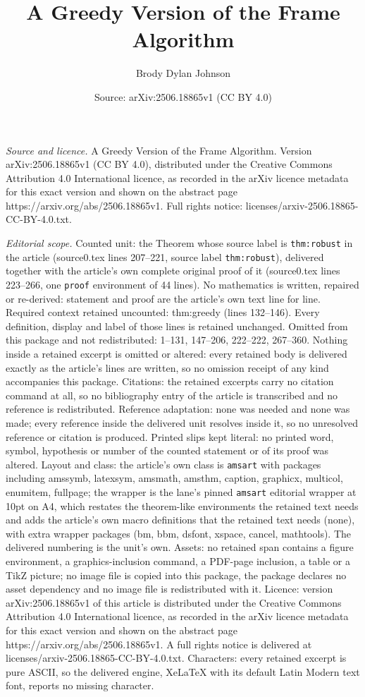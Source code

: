 \documentclass[10pt,a4paper]{amsart}
\title[A Greedy Version of the Frame Algorithm]{A Greedy Version of the Frame Algorithm}
\author{Brody Dylan Johnson}
\date{Source: arXiv:2506.18865v1 (CC BY 4.0)}
\begin{document}
\maketitle

\noindent\emph{Source and licence.} A Greedy Version of the Frame Algorithm. Version arXiv:2506.18865v1 (CC BY 4.0), distributed under the Creative Commons Attribution 4.0 International licence, as recorded in the arXiv licence metadata for this exact version and shown on the abstract page https://arxiv.org/abs/2506.18865v1. Full rights notice: licenses/arxiv-2506.18865-CC-BY-4.0.txt.\par\smallskip

\noindent\textit{Editorial scope.} Counted unit: the Theorem whose source label is \texttt{thm:robust} in the article (source0.tex lines 207--221, source label \texttt{thm:robust}), delivered together with the article's own complete original proof of it (source0.tex lines 223--266, one \texttt{proof} environment of 44 lines). No mathematics is written, repaired or re-derived: statement and proof are the article's own text line for line. Required context retained uncounted: thm:greedy (lines 132--146). Every definition, display and label of those lines is retained unchanged. Omitted from this package and not redistributed: 1--131, 147--206, 222--222, 267--360. Nothing inside a retained excerpt is omitted or altered: every retained body is delivered exactly as the article's lines are written, so no omission receipt of any kind accompanies this package. Citations: the retained excerpts carry no citation command at all, so no bibliography entry of the article is transcribed and no reference is redistributed. Reference adaptation: none was needed and none was made; every reference inside the delivered unit resolves inside it, so no unresolved reference or citation is produced. Printed slips kept literal: no printed word, symbol, hypothesis or number of the counted statement or of its proof was altered. Layout and class: the article's own class is \texttt{amsart} with packages including amssymb, latexsym, amsmath, amsthm, caption, graphicx, multicol, enumitem, fullpage; the wrapper is the lane's pinned \texttt{amsart} editorial wrapper at 10pt on A4, which restates the theorem-like environments the retained text needs and adds the article's own macro definitions that the retained text needs (none), with extra wrapper packages (bm, bbm, dsfont, xspace, cancel, mathtools). The delivered numbering is the unit's own. Assets: no retained span contains a figure environment, a graphics-inclusion command, a PDF-page inclusion, a table or a TikZ picture; no image file is copied into this package, the package declares no asset dependency and no image file is redistributed with it. Licence: version arXiv:2506.18865v1 of this article is distributed under the Creative Commons Attribution 4.0 International licence, as recorded in the arXiv licence metadata for this exact version and shown on the abstract page https://arxiv.org/abs/2506.18865v1. A full rights notice is delivered at licenses/arxiv-2506.18865-CC-BY-4.0.txt. Characters: every retained excerpt is pure ASCII, so the delivered engine, XeLaTeX with its default Latin Modern text font, reports no missing character.
\end{document}

